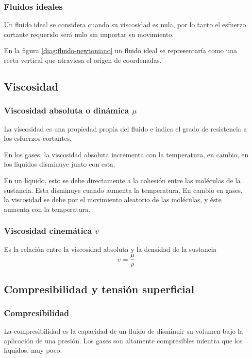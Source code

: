 \subsubsection{Fluidos ideales}

Un fluido ideal se considera cuando su viscosidad es nula, por lo tanto el esfuerzo cortante requerido será nulo sin importar su movimiento.

En la figura \ref{diag:fluido-newtoniano} un fluido ideal se representaría como una recta vertical que atraviesa el origen de coordenadas.



\subsection{Viscosidad}
\subsubsection{Viscosidad absoluta o dinámica $\mu$}
La viscosidad es una propiedad propia del fluido e indica el grado de resistencia a los esfuerzos cortantes.

En los gases, la viscosidad absoluta incrementa con la temperatura, en cambio, en los líquidos disminuye junto con esta. 

En un líquido, esto se debe directamente a la cohesión entre las moléculas de la sustancia. Esta disminuye cuando aumenta la temperatura. En cambio en gases, la viscosidad se debe por el movimiento aleatorio de las moléculas, y éste aumenta con la temperatura.

\subsubsection{Viscosidad cinemática $v$}

Es la relación entre la viscosidad absoluta y la densidad de la sustancia
\begin{equation}
	v = \dfrac{\mu}{\rho}
\end{equation}

\subsection{Compresibilidad y tensión superficial}
\subsubsection{Compresibilidad}
La compresibilidad es la capacidad de un fluido de disminuir su volumen bajo la aplicación de una presión. Los gases son altamente compresibles mientra que los líquidos, muy poco. 

